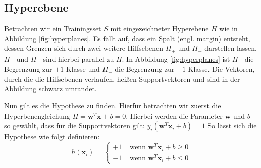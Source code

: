 \documentclass[10pt,a4paper]{scrartcl}
\begin{document}
\begin{multicols}{2}
            \subsection{Hyperebene}
                Betrachten wir ein Trainingsset $S$ mit eingezeichneter Hyperebene $H$ wie in Abbildung \ref{fig:hyperplanes}. Es fällt auf, dass ein Spalt (engl. margin) entsteht, dessen Grenzen sich durch zwei weitere Hilfsebenen $H_+$ und $H_-$ darstellen lassen. $H_+$ und $H_-$ sind hierbei parallel zu $H$. In Abbildung \ref{fig:hyperplanes} ist $H_+$ die Begrenzung zur $+1$-Klasse und $H_-$ die Begrenzung zur $-1$-Klasse. Die Vektoren, durch die die Hilfsebenen verlaufen, heißen Supportvektoren und sind in der Abbildung schwarz umrandet.
                \begin{figure}[H]
                \end{figure}
                Nun gilt es die Hypothese zu finden. Hierfür betrachten wir zuerst die Hyperbenengleichung $H = \boldsymbol{w}^T \boldsymbol{x} + b = 0$. 
                Hierbei werden die Parameter $\boldsymbol{w}$ und $b$ so gewählt, dass für die Supportvektoren gilt: $y_i ( \boldsymbol{w}^T \boldsymbol{x}_i + b ) = 1$
                So lässt sich die Hypothese wie folgt definieren:
                \begin{equation*}
                    h(\boldsymbol{x}_i) = \begin{cases}
                        +1 & \text{ wenn } \boldsymbol{w}^T \boldsymbol{x}_i + b \geq 0 \\
                        -1 & \text{ wenn } \boldsymbol{w}^T \boldsymbol{x}_i + b \leq 0
                    \end{cases}
                \end{equation*}


\end{multicols}
\end{document}
